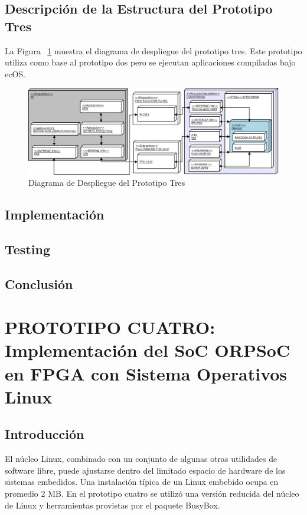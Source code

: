 \newpage
		
		\subsection{Descripción de la Estructura del Prototipo Tres}
		La Figura ~\ref{fig:ecos} muestra el diagrama de despliegue del prototipo tres. Este prototipo utiliza como base al prototipo dos pero se ejecutan 
		aplicaciones compiladas bajo ecOS.
		
		\begin{figure}[h!]
 		\begin{center}
  		\includegraphics[width=1\textwidth,keepaspectratio=true]{./images/ecos}
  		\caption{Diagrama de Despliegue del Prototipo Tres}
  		\label{fig:ecos} 
 		\end{center}
		\end{figure}
	
		\subsection{Implementación}	
	    
	    
		
		
		\subsection{Testing}
		
		\subsection{Conclusión}


\newpage
				
	\section{PROTOTIPO CUATRO: Implementación del SoC ORPSoC en FPGA con Sistema Operativos Linux}
		\subsection{Introducción}
		El núcleo Linux, combinado con un conjunto de algunas otras utilidades de software libre, puede ajustarse dentro del limitado espacio de hardware 
	    de los sistemas embedidos. Una instalación típica de un Linux embebido ocupa en promedio 2 MB. En el prototipo cuatro se utilizó una versión
	    reducida del núcleo de Linux y herramientas provistas por el paquete BusyBox. 
		
